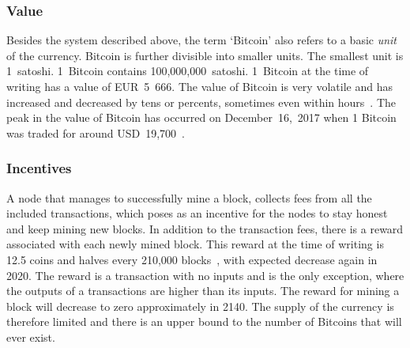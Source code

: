 \subsubsection{Value}
Besides the system described above, the term `Bitcoin' also refers to a basic \textit{unit} of the currency. Bitcoin is further divisible into smaller units. The smallest unit is 1~satoshi. 1~Bitcoin contains 100,000,000~satoshi. 1~Bitcoin at the time of writing has a value of EUR~5~666. The value of Bitcoin is very volatile and has increased and decreased by tens or percents, sometimes even within hours~\cite{Adkisson2018WhyVolatile}. The peak in the value of Bitcoin has occurred on December~16,~2017 when 1 Bitcoin was traded for around USD~19,700~\cite{WolfieZhao2017BitcoinHigh}.

\subsubsection{Incentives}
A node that manages to successfully mine a block, collects fees from all the included transactions, which poses as an incentive for the nodes to stay honest and keep mining new blocks. In addition to the transaction fees, there is a reward associated with each newly mined block. This reward at the time of writing is 12.5 coins and halves every 210,000 blocks~\cite{Judmayer2017BlocksMechanisms}, with expected decrease again in 2020. The reward is a transaction with no inputs and is the only exception, where the outputs of a transactions are higher than its inputs. The reward for mining a block will decrease to zero approximately in 2140. The supply of the currency is therefore limited and there is an upper bound to the number of Bitcoins that will ever exist\footnotemark.


